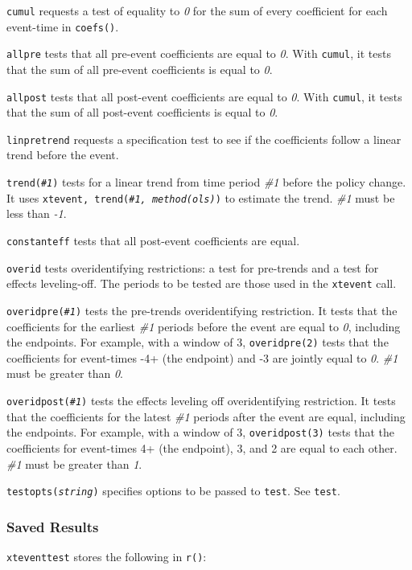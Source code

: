 \documentclass[12pt]{article}
\begin{document}
\hangpara
\texttt{cumul} requests a test of equality to {\it 0} for the sum of every coefficient for each event-time in \texttt{coefs()}.

\hangpara
\texttt{allpre} tests that all pre-event coefficients are equal to {\it 0}.
With \texttt{cumul}, it tests that the sum of all pre-event coefficients is equal to {\it 0}.

\hangpara
\texttt{allpost} tests that all post-event coefficients are equal to {\it 0}.
With \texttt{cumul}, it tests that the sum of all post-event coefficients is equal to {\it 0}.

\hangpara
\texttt{linpretrend} requests a specification test to see if the coefficients follow a linear trend before the event.

\hangpara
\texttt{trend({\it \#1})} tests for a linear trend from time period {\it \#1} before the policy change. It uses \texttt{xtevent, trend({\it \#1, method(ols)})} to estimate the trend. {\it \#1} must be less than {\it -1}.

\hangpara
\texttt{constanteff} tests that all post-event coefficients are equal.

\hangpara
\texttt{overid} tests overidentifying restrictions: a test for pre-trends and a test for effects leveling-off. The periods to be tested are those used in the \texttt{xtevent} call.

\hangpara
\texttt{overidpre({\it \#1})} tests the pre-trends overidentifying restriction. It tests that the coefficients for the earliest {\it \#1} periods before the event are equal to {\it 0}, including the endpoints.
For example, with a window of 3, \texttt{overidpre(2)} tests that the coefficients for event-times -4+ (the endpoint) and -3 are jointly equal to {\it 0}.
{\it \#1} must be greater than {\it 0}.

\hangpara
\texttt{overidpost({\it \#1})} tests the effects leveling off overidentifying restriction. It tests that the coefficients for the latest {\it \#1} periods after the event are equal, including the endpoints.
For example, with a window of 3, \texttt{overidpost(3)} tests that the coefficients for event-times 4+ (the endpoint), 3, and 2 are equal to each other.
{\it \#1} must be greater than {\it 1}.

\hangpara
\texttt{testopts({\it string})} specifies options to be passed to \texttt{test}. See \texttt{test}.


\subsubsection{Saved Results}
{\tt xteventtest} stores the following in {\tt r()}:
\end{document}
